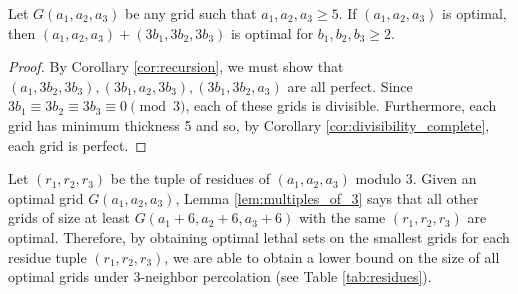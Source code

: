 
\begin{lem}
\label{lem:multiples_of_3}
Let $G(a_1,a_2,a_3)$ be any grid such that $a_1, a_2, a_3 \geq 5$. If $(a_1,a_2,a_3)$ is optimal, then $(a_1,a_2,a_3) + (3b_1,3b_2,3b_3)$ is optimal for $b_1,b_2,b_3 \geq 2$. 
\end{lem}

\begin{proof}
By Corollary \ref{cor:recursion}, we must show that $(a_1,3b_2,3b_3), (3b_1,a_2,3b_3), (3b_1,3b_2,a_3)$ are all perfect. Since $3b_1 \equiv 3b_2 \equiv 3b_3 \equiv 0 \pmod 3$, each of these grids is divisible. Furthermore, each grid has minimum thickness 5 and so, by Corollary \ref{cor:divisibility_complete}, each grid is perfect.
\end{proof}

Let $(r_1,r_2,r_3)$ be the tuple of residues of $(a_1,a_2,a_3)$ modulo 3. Given an optimal grid $G(a_1,a_2,a_3)$, Lemma \ref{lem:multiples_of_3} says that all other grids of size at least $G(a_1+6,a_2+6,a_3+6)$ with the same $(r_1,r_2,r_3)$ are optimal. Therefore, by obtaining optimal lethal sets on the smallest grids for each residue tuple $(r_1,r_2,r_3)$, we are able to obtain a lower bound on the size of all optimal grids under 3-neighbor percolation (see Table \ref{tab:residues}).

